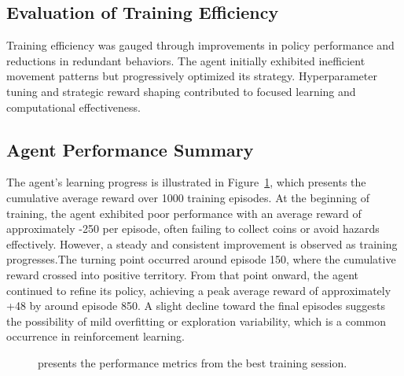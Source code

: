 \documentclass[12pt,oneside,openright,a4paper]{cpe-english-project}
\begin{document}
\subsection{Evaluation of Training Efficiency}

Training efficiency was gauged through improvements in policy performance and reductions in redundant behaviors. The agent initially exhibited inefficient movement patterns but progressively optimized its strategy. Hyperparameter tuning and strategic reward shaping contributed to focused learning and computational effectiveness.

\subsection{Agent Performance Summary}
The agent’s learning progress is illustrated in Figure~\ref{fig:reward_progress}, which presents the cumulative average reward over 1000 training episodes. At the beginning of training, the agent exhibited poor performance with an average reward of approximately -250 per episode, often failing to collect coins or avoid hazards effectively. However, a steady and consistent improvement is observed as training progresses.The turning point occurred around episode 150, where the cumulative reward crossed into positive territory. From that point onward, the agent continued to refine its policy, achieving a peak average reward of approximately +48 by around episode 850. A slight decline toward the final episodes suggests the possibility of mild overfitting or exploration variability, which is a common occurrence in reinforcement learning.

\begin{figure}[H]
\centering
{}
\caption{ presents the performance metrics from the best training session.}
\label{fig:reward_progress}
\end{figure}
\end{document}
